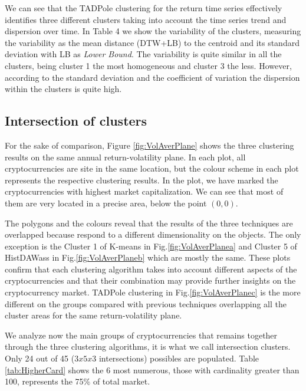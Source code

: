 \documentclass{bmcart}
\begin{document}
We can see that the TADPole clustering for the return time series effectively identifies three different clusters taking into account the time series trend and dispersion over time. In Table 4 we show the variability of the clusters, measuring the variability as the mean distance (DTW+LB) to the centroid and its standard deviation with LB as \textit{Lower Bound}. The variability is quite similar in all the clusters, being cluster 1 the most homogeneous and cluster 3 the less. However, according to the standard deviation and the coefficient of variation the dispersion within the clusters is quite high. 

\subsection*{Intersection of clusters}

For the sake of comparison, Figure \ref{fig:VolAverPlane} shows the three clustering results on the same annual return-volatility plane. In each plot, all cryptocurrencies are site in the same location, but the colour scheme in each plot represents the respective clustering results. In the plot, we have marked the cryptocurrencies with highest market capitalization. We can see that most of them are very located in a precise area, below the point $(0,0)$. 

The polygons and the colours reveal that the results of the three techniques  are overlapped because respond to a different dimensionality on the objects. The only exception is the Cluster 1 of K-means in Fig.\ref{fig:VolAverPlanea} and Cluster 5 of HistDAWass in Fig.\ref{fig:VolAverPlaneb} which are mostly the same. These plots confirm that each clustering algorithm takes into account different aspects of the cryptocurrencies and that their combination may provide further insights on the cryptocurrency market. TADPole clustering in Fig.\ref{fig:VolAverPlanec} is the more different on the groups compared with previous techniques overlapping all the cluster areas for the same return-volatility plane.

We analyze now the main groups of cryptocurrencies that remains together through the three clustering algorithms, it is what we call intersection clusters. Only 24 out of 45 ($3 x 5 x 3$ intersections) possibles are populated. Table \ref{tab:HigherCard} shows the 6 most numerous, those with cardinality greater than 100, represents the 75\% of total market.
\end{document}
